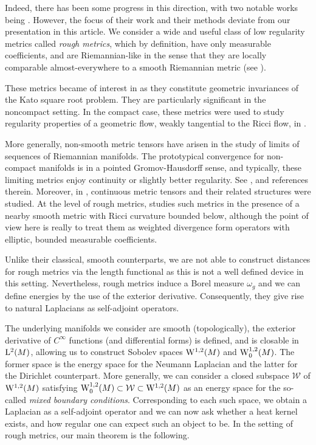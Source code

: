 \documentclass[AMS,STIX1COL]{WileyNJD-v2}
\numberwithin{equation}{section}
\renewcommand{\~}{\tilde}
\renewcommand{\-}{\bar}
\newcommand{\8}{\infty}
\newcommand{\cW}{\mathcal{W}}
\newcommand{\Lp}[2][{}]{{\rm L}^{#2}_{\rm #1}}		%
\newcommand{\Sob}[2][{}]{{\rm W}^{#2}_{\rm #1}}		%
\newcommand{\SobH}[2][{}]{{\Sob[#1]{#2,2}}}	%
\begin{document}
Indeed, there has been some progress in this direction,
with two notable works being \cite{Norris, ERS}.
However, the focus of their work and their methods deviate from our presentation in this article.
We consider a wide and useful class of 
low regularity metrics called \emph{rough metrics}, 
which by definition, have only measurable coefficients, and are Riemannian-like in the sense
that they are locally comparable almost-everywhere to a smooth Riemannian metric (see ).

These metrics became of interest in \cite{BMc, BRough} as they constitute geometric invariances of the Kato square
root problem. They are particularly significant in the noncompact setting.  
In the compact case, these metrics were used to study regularity properties
of a geometric flow, weakly tangential to the Ricci flow, 
in \cite{BLM, BCont}.

More generally, non-smooth metric tensors have arisen in the study of limits of sequences of Riemannian manifolds.
The prototypical convergence for non-compact manifolds is in a pointed Gromov-Hausdorff sense, and typically, these limiting metrics enjoy continuity or slightly better regularity.
See \cite{Petersen}, \cite{Perales} and references therein.
Moreover, in \cite{Burtscher}, continuous metric tensors and their related structures were studied. 
At the level of rough metrics, \cite{SC} studies such metrics in the presence of a nearby smooth metric with Ricci curvature bounded below, although the point of view here is really to treat them as weighted divergence form operators with elliptic, bounded measurable coefficients.


Unlike their classical, smooth counterparts, we are not able
to construct distances for rough metrics via the length functional as 
this is not a well defined device in this setting.
Nevertheless, rough metrics induce a Borel measure $\omega_g$ and we can define energies by the use 
of the exterior derivative. Consequently,  they give rise to natural Laplacians as self-adjoint operators.

The underlying manifolds we consider are smooth (topologically), 
the exterior derivative of \(C^{\infty}\) functions (and  differential forms)
 is defined, and is closable 
in $\Lp{2}(M)$, allowing us to construct Sobolev spaces $\SobH{1}(M)$
and $\SobH[0]{1}(M)$. The
former space is the energy space for the Neumann Laplacian
and the latter for the Dirichlet counterpart.
More generally, we can consider a closed subspace $\cW$ of $\SobH{1}(M)$
satisfying $\SobH[0]{1}(M) \subset \cW \subset \SobH{1}(M)$
as an energy space for the so-called \emph{mixed boundary conditions}. 
Corresponding to each such space, we obtain a Laplacian
as a self-adjoint operator and we can now ask
whether a heat kernel exists, and how regular one
can expect such an object to be. In the setting of rough metrics, our main theorem
is the following. 
\end{document}
